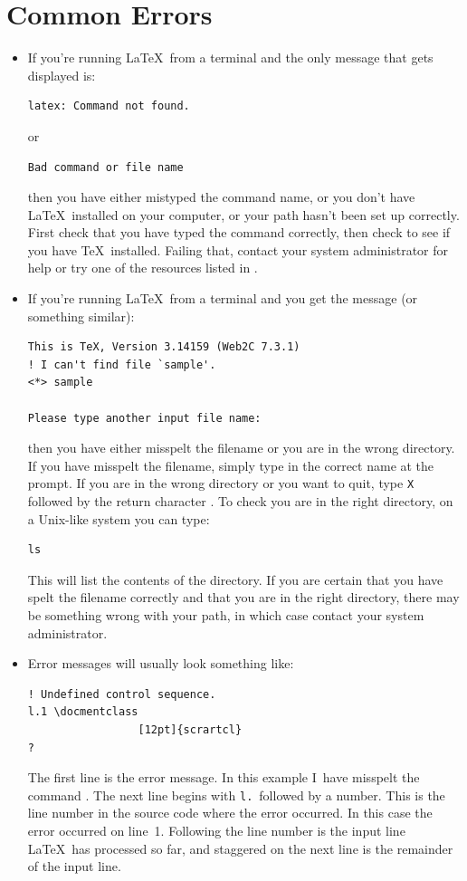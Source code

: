 
\chapter{Common Errors}
\label{ch:errors}

\begin{itemize}
\item
If you're running \LaTeX\ from a \gls{terminal} and the only message that gets displayed is:
\begin{verbatim}
latex: Command not found.
\end{verbatim}
or
\begin{verbatim}
Bad command or file name
\end{verbatim}
then you have either mistyped the command name, or you
don't have \LaTeX\ installed on your computer, or your path hasn't
been set up correctly.  First check that you have typed the command
correctly, then check to see if you have \TeX\ installed.  Failing
that, contact your system administrator for help or try one of the
resources listed in .

\item
If you're running \LaTeX\ from a \gls{terminal} and you get the message (or something similar):
\begin{verbatim}
This is TeX, Version 3.14159 (Web2C 7.3.1)
! I can't find file `sample'.
<*> sample
          
Please type another input file name: 
\end{verbatim}
then you have either misspelt the filename or you are in the wrong
directory.  If you have misspelt the filename, simply type in the
correct name at the prompt.  If you are in the wrong directory or you
want to quit, type \texttt{X} followed by the return character \enter.
To check you are in
the right directory, on a Unix-like system you can type:
\begin{verbatim}
ls
\end{verbatim}
This will list the contents of
the directory.  If you are certain that you have spelt the filename
correctly and that you are in the right directory, there may be
something wrong with your path, in which case contact your system
administrator.

\item
Error messages will usually look something like:
\begin{verbatim}
! Undefined control sequence.
l.1 \docmentclass
                 [12pt]{scrartcl}
? 
\end{verbatim}
The first line is the error message.  In this example I~have misspelt
the command .  The next line begins with
\texttt{l.}\ followed by a number.  This is the line number in the
source code where the error occurred.  In this case the error
occurred on line~1.  Following the line number is the input line
\LaTeX\ has processed so far, and staggered on the next line is the
remainder of the input line.


\end{itemize}
